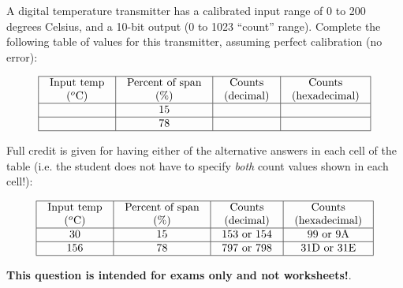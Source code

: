 

A digital temperature transmitter has a calibrated input range of 0 to 200 degrees Celsius, and a 10-bit output (0 to 1023 ``count'' range).  Complete the following table of values for this transmitter, assuming perfect calibration (no error):


$$\vbox{\offinterlineskip
\halign{\strut
\vrule \quad\hfil # \ \hfil & 
\vrule \quad\hfil # \ \hfil & 
\vrule \quad\hfil # \ \hfil & 
\vrule \quad\hfil # \ \hfil \vrule \cr
\noalign{\hrule}
%
Input temp & Percent of span & Counts & Counts \cr
%
($^{o}$C) & (\%) & (decimal) & (hexadecimal) \cr
%
\noalign{\hrule}
%
 & 15 &  &  \cr
%
\noalign{\hrule}
%
 & 78 &  &  \cr
%
\noalign{\hrule}
} %
}$$ %







Full credit is given for having either of the alternative answers in each cell of the table (i.e. the student does not have to specify {\it both} count values shown in each cell!):


$$\vbox{\offinterlineskip
\halign{\strut
\vrule \quad\hfil # \ \hfil & 
\vrule \quad\hfil # \ \hfil & 
\vrule \quad\hfil # \ \hfil & 
\vrule \quad\hfil # \ \hfil \vrule \cr
\noalign{\hrule}
%
Input temp & Percent of span & Counts & Counts \cr
%
($^{o}$C) & (\%) & (decimal) & (hexadecimal) \cr
%
\noalign{\hrule}
%
30 & 15 & 153 or 154 & 99 or 9A \cr
%
\noalign{\hrule}
%
156 & 78 & 797 or 798 & 31D or 31E \cr
%
\noalign{\hrule}
} %
}$$ %







{\bf This question is intended for exams only and not worksheets!}.



